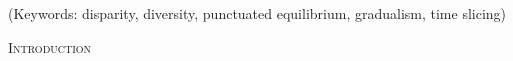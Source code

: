 \documentclass[12pt,letterpaper]{article}
\renewcommand{\section}[1]{%
\bigskip
\begin{center}
\begin{Large}
\normalfont\scshape #1
\medskip
\end{Large}
\end{center}}
\begin{document}
\noindent (Keywords: disparity, diversity, punctuated equilibrium, gradualism, time slicing)\\
\vspace{1.5in}

\newpage 

%
%

\section{Introduction}


\end{document}
